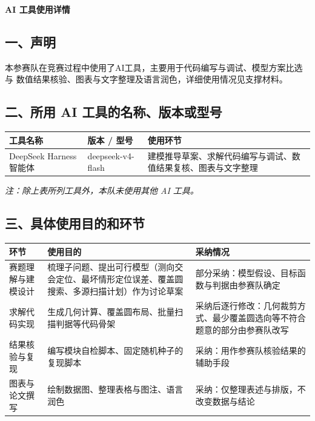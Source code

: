 \documentclass[12pt,a4paper]{ctexart}
\providecommand{\AIDeclSentence}{%
  本参赛队在竞赛过程中使用了AI工具，主要用于代码编写与调试、模型方案比选与%
  数值结果核验、图表与文字整理及语言润色，详细使用情况见支撑材料。%
}
\begin{document}
\begin{center}
  {\bfseries AI 工具使用详情}\\[0.6em]
\end{center}

\subsection*{一、声明}

\AIDeclSentence

\subsection*{二、所用 AI 工具的名称、版本或型号}

\begin{table}[htbp]
  \centering
  \begin{tabular}{@{}p{5.0cm}p{3.5cm}p{6.45cm}@{}}
    \toprule
    工具名称 & 版本 / 型号 & 使用环节 \\
    \midrule
    DeepSeek Harness 智能体 & deepseek-v4-flash &
      建模推导草案、求解代码编写与调试、数值结果复核、图表与文字整理 \\
    \bottomrule
  \end{tabular}
\end{table}

\noindent\emph{注：除上表所列工具外，本队未使用其他 AI 工具。}

\subsection*{三、具体使用目的和环节}

\begin{table}[htbp]
  \centering
  \begin{tabular}{@{}p{3.0cm}p{5.2cm}p{6.75cm}@{}}
    \toprule
    环节 & 使用目的 & 采纳情况 \\
    \midrule
    赛题理解与建模设计 &
      梳理子问题、提出可行模型（测向交会定位、最坏情形定位误差、覆盖圆搜索、多源扫描计划）作为讨论草案 &
      部分采纳：模型假设、目标函数与判据由参赛队确定 \\
    \addlinespace
    求解代码实现 &
      生成几何计算、覆盖圆布局、批量扫描判据等代码骨架 &
      采纳后逐行修改：几何裁剪方式、最少覆盖圆选向等不符合题意的部分由参赛队改写 \\
    \addlinespace
    结果核验与复现 &
      编写模块自检脚本、固定随机种子的复现脚本 &
      采纳：用作参赛队核验结果的辅助手段 \\
    \addlinespace
    图表与论文撰写 &
      绘制数据图、整理表格与图注、语言润色 &
      采纳：仅整理表述与排版，不改变数据与结论 \\
    \bottomrule
  \end{tabular}
\end{table}
\end{document}
